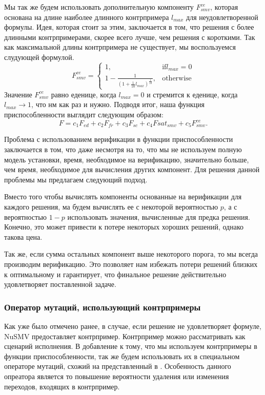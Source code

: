 \documentclass[14pt]{extarticle}
\theoremstyle{plain}
\theoremstyle{definition}
\begin{document}
Мы так же будем использовать дополнительную компоненту $F^{ce}_{smv}$, которая
основана на длине наиболее длинного контрпримера $l_{max}$ для
неудовлетворенной формулы. Идея, которая стоит за этим, заключается в том, что
решения с более длинными контрпримерами, скорее всего лучше, чем решения с
короткими. Так как максимальной длины контрпримера не существует, мы
воспользуемся слудующей формулой.
$$
F^{ce}_{smv} = \begin{cases} 1, & \mbox{if} l_{max} = 0 \\
1 - \frac{1}{(1 + \frac{1}{10}l_{max})^{\frac{1}{10}}}, & \mbox{otherwise}
\end{cases}
$$
Значение $F^{ce}_{smv}$ равно еденице, когда $l_{max} = 0$ и стремится к
еденице, когда $l_{max} \rightarrow 1$, что нм как раз и нужно. Подводя итог,
наша функция приспособленности выглядит следующим образом:
$$
F = c_1 F_{ed} + c_2 F_{fr} + c_3 F_{sc} + c_4 F{sat}_{smv} + c_5 F^{ce}_{smv}.
$$

Проблема с использованием верификации в функции приспособленности заключается
в том, что даже несмотря на то, что мы не используем полную модель установки,
время, необходимое на верификацию, значительно больше, чем время, необходимое
для вычисления других компонент. Для решения данной проблемы мы предлагаем
следующий подход.

Вместо того чтобы вычислять компоненты основанные на верификации для каждого
решения, ма будем вычислять ее с некоторой вероятностью $p$, а с вероятностью
$1 - p$ использовать значения, вычисленные для предка решения. Конечно, это
может привести к потере некоторых хороших решений, однако такова цена.

Так же, если сумма остальных компонент выше некоторого порога, то мы всегда
производим верификацию. Это позволяет нам избежать потери решений близких к
оптимальному и гарантирует, что финальное решение действительно удовлетворяет
поставленной задаче.

\subsubsection{Оператор мутаций, использующий контрпримеры}

Как уже было отмечено ранее, в случае, если решение не удовлетворяет формуле,
NuSMV предоставляет контрпример. Контрпример можно рассматривать как сценарий
исполнения. В добавление к тому, что мы используем контрпримеры в функции
приспособленности, так же будем использовать их в специальном операторе
мутаций, схожий на представленный в \cite{et}. Особенность данного опреатора является то повышение вероятности
удаления или изменения переходов, входящих в контрпример.
\end{document}
